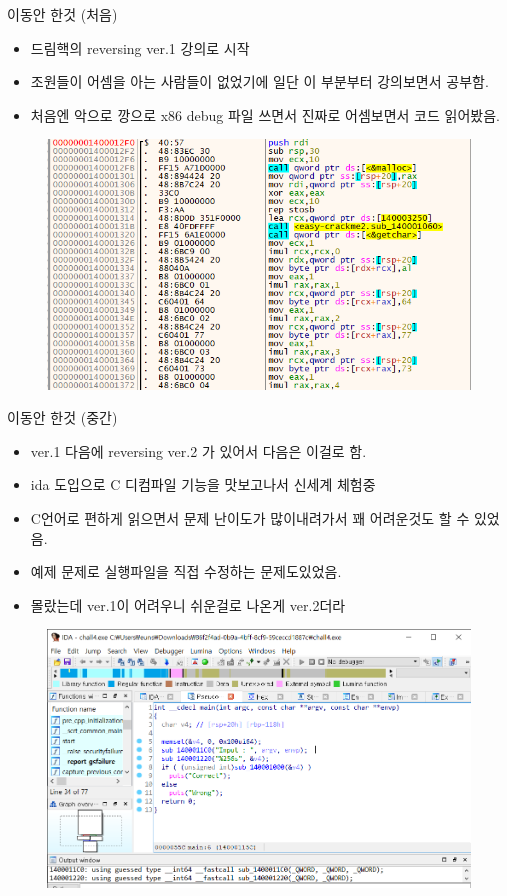 \documentclass[10pt]{beamer}
\begin{document}
\begin{frame}{이동안 한것 (처음)}
    \begin{itemize}
        \item 드림핵의 reversing ver.1 강의로 시작
        \item 조원들이 어셈을 아는 사람들이 없었기에 일단 이 부분부터 강의보면서 공부함. 
        \item 처음엔 악으로 깡으로 x86 debug 파일 쓰면서 진짜로 어셈보면서 코드 읽어봤음.
    \end{itemize}
    \begin{figure}
        \includegraphics[width=0.6\columnwidth]{reversing.png}
    \end{figure}
\end{frame}

\begin{frame}{이동안 한것 (중간)}
    \begin{itemize}
        \item ver.1 다음에 reversing ver.2 가 있어서 다음은 이걸로 함.
        \item ida 도입으로 C 디컴파일 기능을 맛보고나서 신세계 체험중
        \item  C언어로 편하게 읽으면서 문제 난이도가 많이내려가서 꽤 어려운것도 할 수 있었음.
        \item 예제 문제로 실행파일을 직접 수정하는 문제도있었음.
        \item 몰랐는데 ver.1이 어려우니 쉬운걸로 나온게 ver.2더라
    \end{itemize}
    \begin{figure}
        \includegraphics[width=0.6\columnwidth]{ida.png}
    \end{figure}
\end{frame}
\end{document}
